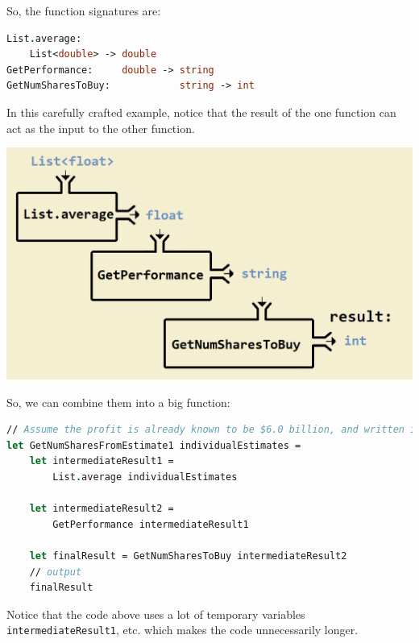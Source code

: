 \documentclass[12pt]{article}
\begin{document}
So, the function signatures are:
\begin{lstlisting}[language=FSharp]
List.average:        
    List<double> -> double
GetPerformance:     double -> string
GetNumSharesToBuy:            string -> int
\end{lstlisting}
In this carefully crafted example, notice that the result of the one function can act as the input to the other function. 
\begin{center}
\includegraphics[width=16cm]{pictures/picture24.png}
\end{center}
So, we can combine them into a big function:
\begin{lstlisting}[language=FSharp]
// Assume the profit is already known to be $6.0 billion, and written in "GetPerformance"
let GetNumSharesFromEstimate1 individualEstimates =
    let intermediateResult1 = 
        List.average individualEstimates

    let intermediateResult2 = 
        GetPerformance intermediateResult1

    let finalResult = GetNumSharesToBuy intermediateResult2
    // output
    finalResult
\end{lstlisting}
Notice that the code above uses a lot of temporary variables \texttt{intermediateResult1}, etc. which makes the code unnecessarily longer.

\pagebreak
\end{document}
